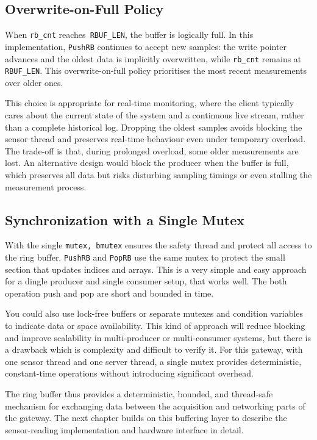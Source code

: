 \subsection{Overwrite-on-Full Policy}
When \texttt{rb\_cnt} reaches\texttt{ RBUF\_LEN}, the buffer is logically full. In this implementation, \texttt{PushRB} continues to accept new samples: the write pointer advances and the oldest data is implicitly overwritten, while \texttt{rb\_cnt} remains at \texttt{RBUF\_LEN}. This overwrite-on-full policy prioritises the most recent measurements over older ones.

This choice is appropriate for real-time monitoring, where the client typically cares about the current state of the system and a continuous live stream, rather than a complete historical log. Dropping the oldest samples avoids blocking the sensor thread and preserves real-time behaviour even under temporary overload. The trade-off is that, during prolonged overload, some older measurements are lost. An alternative design would block the producer when the buffer is full, which preserves all data but risks disturbing sampling timings or even stalling the measurement process.

\subsection{Synchronization with a Single Mutex}
With the single \texttt{mutex, bmutex} ensures the safety thread and protect all access to the ring buffer. \texttt{PushRB} and \texttt{PopRB} use the same mutex to protect the small section that updates indices and arrays. This is a very simple and easy approach for a dingle producer and single consumer setup, that works well. The both operation push and pop are short and bounded in time.

You could also use lock-free buffers or separate mutexes and condition variables to indicate data or space availability. This kind of approach will reduce blocking and improve scalability in multi-producer or multi-consumer systems, but there is a drawback which is complexity and difficult to verify it. For this gateway, with one sensor thread and one server thread, a single mutex provides deterministic, constant-time operations without introducing significant overhead.

The ring buffer thus provides a deterministic, bounded, and thread-safe mechanism for exchanging data between the acquisition and networking parts of the gateway. The next chapter builds on this buffering layer to describe the sensor-reading implementation and hardware interface in detail.


















